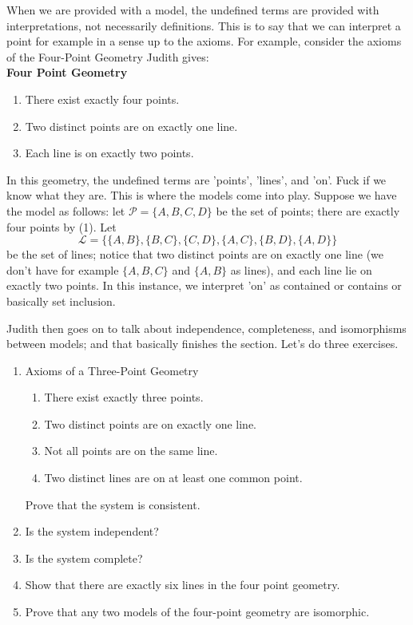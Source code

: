 \documentclass[12pt]{book}
\def\cL{{\mathcal{L}}}
\def\cP{{\mathcal{P}}}
\begin{document}
When we are provided with a model, the undefined terms are provided with interpretations, not necessarily definitions. This is to say that we can interpret a point for example in a sense up to the axioms. For example, consider the axioms of the Four-Point Geometry Judith gives:\\

\textbf{Four Point Geometry}
\begin{enumerate}[nolistsep]
\item There exist exactly four points.
\item Two distinct points are on exactly one line.
\item Each line is on exactly two points.\\
\end{enumerate}

In this geometry, the undefined terms are 'points', 'lines', and 'on'. Fuck if we know what they are. This is where the models come into play. Suppose we have the model as follows: let $\cP=\{A,B,C,D\}$ be the set of points; there are exactly four points by (1). Let 
\[\cL=\{\{A,B\},\{B,C\},\{C,D\},\{A,C\},\{B,D\},\{A,D\}\}\] 
be the set of lines; notice that two distinct points are on exactly one line (we don't have for example $\{A,B,C\}$ and $\{A,B\}$ as lines), and each line lie on exactly two points. In this instance, we interpret 'on' as contained or contains or basically set inclusion.

Judith then goes on to talk about independence, completeness, and isomorphisms between models; and that basically finishes the section. Let's do three exercises.

\begin{enumerate}
\item Axioms of a Three-Point Geometry
\begin{enumerate}[nolistsep]
\item There exist exactly three points.
\item Two distinct points are on exactly one line.
\item Not all points are on the same line.
\item Two distinct lines are on at least one common point.
\end{enumerate}
Prove that the system is consistent.

\item Is the system independent?
\item Is the system complete?
\item Show that there are exactly six lines in the four point geometry.
\item Prove that any two models of the four-point geometry are isomorphic. 
\end{enumerate}
\end{document}
